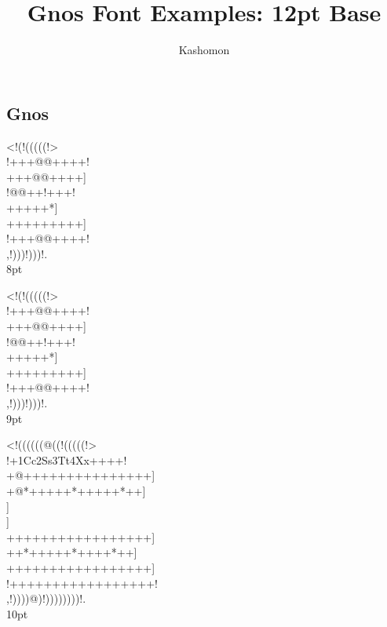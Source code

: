\documentclass[12pt]{article}
\begin{document}
\title{Gnos Font Examples: 12pt Base}
\author{Kashomon}
\maketitle

\begin{center}
\section*{Gnos}
{
\gnoseight%
<!(!(((((!>\\
!+++@@++++!\\
+++@@++++]\\
!@@++!+++!\\
+++++*]\\
+++++++++]\\
!+++@@++++!\\
,!)))!)))!.\\
}
8pt

{
\gnosnine%
<!(!(((((!>\\
!+++@@++++!\\
+++@@++++]\\
!@@++!+++!\\
+++++*]\\
+++++++++]\\
!+++@@++++!\\
,!)))!)))!.\\
}
9pt

{\gnosten%
<!((((((@((!(((((!>\\
!+1Cc2Ss3Tt4Xx++++!\\
+@+++++++++++++++]\\
+@*+++++*+++++*++]\\}
{\gnosb{}}{\gnos]\\}
{\gnosw{}}{\gnos]\\
+++++++++++++++++]\\
++*++{\gnoswiii{}}+++*++++*++]\\
+++++++++++++++++]\\
!+++++++++++++++++!\\
,!))))@)!))))))))!.\\
}
10pt


\end{center}
\end{document}

